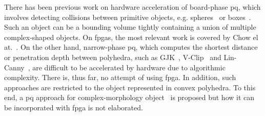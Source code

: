 There has been previous work on hardware acceleration of board-phase \gls{pq}, which involves detecting collisions between primitive objects, e.g. spheres~\cite{benallegue09} or boxes~\cite{zhang07}. 
Such an object can be a bounding volume tightly containing a union of multiple complex-shaped objects. 
On \glspl{fpga}, the most relevant work is covered by Chow el at.~\cite{chow11}.
On the other hand, narrow-phase \gls{pq}, which computes the shortest distance or penetration depth between polyhedra, such as GJK~\cite{gilbert88}, V-Clip~\cite{mirtich98} and Lin-Canny~\cite{lin91}, are difficult to be accelerated by hardware due to algorithmic complexity. 
There is, thus far, no attempt of using \gls{fpga}. 
In addition, such approaches are restricted to the object represented in convex polyhedra. 
To this end, a \gls{pq} approach for complex-morphology object~\cite{kwok13} is proposed but how it can be incorporated with \gls{fpga} is not elaborated.


